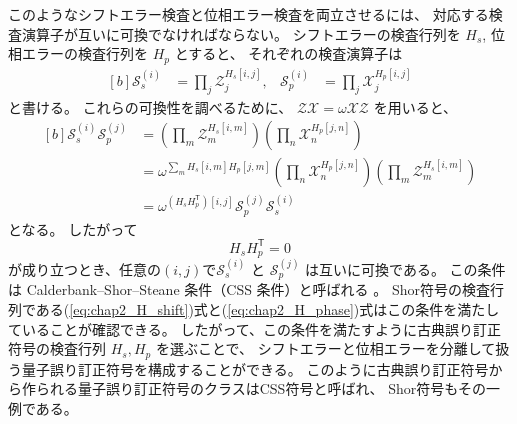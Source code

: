 \documentclass[../master.tex]{subfiles}
\begin{document}
このようなシフトエラー検査と位相エラー検査を両立させるには、
対応する検査演算子が互いに可換でなければならない。
シフトエラーの検査行列を $H_s$, 位相エラーの検査行列を $H_p$ とすると、
それぞれの検査演算子は
\begin{equation}\begin{aligned}[b]
    \mathcal{S}_s^{(i)} &= \prod_j \mathcal{Z}_j^{H_s[i,j]},&
    \mathcal{S}_p^{(i)} &= \prod_j \mathcal{X}_j^{H_p[i,j]}
\end{aligned}\end{equation}
と書ける。
これらの可換性を調べるために、
$\mathcal{Z}\mathcal{X}=\omega \mathcal{X}\mathcal{Z}$ を用いると、
\begin{equation}\begin{aligned}[b]
    \mathcal{S}_s^{(i)} \mathcal{S}_p^{(j)}
    &= \left(\prod_m \mathcal{Z}_m^{H_s[i,m]}\right)
       \left(\prod_n \mathcal{X}_n^{H_p[j,n]}\right) \\
    &= \omega^{\sum_m H_s[i,m]H_p[j,m]}
       \left(\prod_n \mathcal{X}_n^{H_p[j,n]}\right)
       \left(\prod_m \mathcal{Z}_m^{H_s[i,m]}\right) \\
    &= \omega^{(H_s H_p^\mathsf{T})[i,j]}
       \mathcal{S}_p^{(j)} \mathcal{S}_s^{(i)}
\end{aligned}\end{equation}
となる。
したがって
\begin{equation}
    H_s H_p^\mathsf{T} = 0
\end{equation}
が成り立つとき、任意の$(i,j)$で$\mathcal{S}_s^{(i)}$ と $\mathcal{S}_p^{(j)}$ は互いに可換である。
この条件は Calderbank--Shor--Steane 条件（CSS 条件）と呼ばれる
\cite{Calderbank1996-si,Steane1996-is}。
Shor符号の検査行列である(\ref{eq:chap2_H_shift})式と(\ref{eq:chap2_H_phase})式はこの条件を満たしていることが確認できる。
したがって、この条件を満たすように古典誤り訂正符号の検査行列 $H_s,H_p$ を選ぶことで、
シフトエラーと位相エラーを分離して扱う量子誤り訂正符号を構成することができる。
このように古典誤り訂正符号から作られる量子誤り訂正符号のクラスはCSS符号と呼ばれ、
Shor符号もその一例である。
\end{document}
